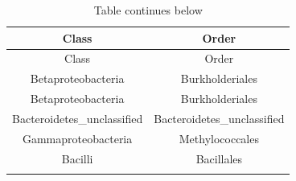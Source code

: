 \documentclass[]{article}
\begin{document}
\begin{longtable}[]{@{}cc@{}}
\caption{Table continues below}\tabularnewline
\toprule
\begin{minipage}[b]{0.38\columnwidth}\centering
Class\strut
\end{minipage} & \begin{minipage}[b]{0.38\columnwidth}\centering
Order\strut
\end{minipage}\tabularnewline
\midrule
\endfirsthead
\toprule
\begin{minipage}[b]{0.38\columnwidth}\centering
Class\strut
\end{minipage} & \begin{minipage}[b]{0.38\columnwidth}\centering
Order\strut
\end{minipage}\tabularnewline
\midrule
\endhead
\begin{minipage}[t]{0.38\columnwidth}\centering
Betaproteobacteria\strut
\end{minipage} & \begin{minipage}[t]{0.38\columnwidth}\centering
Burkholderiales\strut
\end{minipage}\tabularnewline
\begin{minipage}[t]{0.38\columnwidth}\centering
Betaproteobacteria\strut
\end{minipage} & \begin{minipage}[t]{0.38\columnwidth}\centering
Burkholderiales\strut
\end{minipage}\tabularnewline
\begin{minipage}[t]{0.38\columnwidth}\centering
Bacteroidetes\_unclassified\strut
\end{minipage} & \begin{minipage}[t]{0.38\columnwidth}\centering
Bacteroidetes\_unclassified\strut
\end{minipage}\tabularnewline
\begin{minipage}[t]{0.38\columnwidth}\centering
Gammaproteobacteria\strut
\end{minipage} & \begin{minipage}[t]{0.38\columnwidth}\centering
Methylococcales\strut
\end{minipage}\tabularnewline
\begin{minipage}[t]{0.38\columnwidth}\centering
Bacilli\strut
\end{minipage} & \begin{minipage}[t]{0.38\columnwidth}\centering
Bacillales\strut
\end{minipage}\tabularnewline
\begin{minipage}[t]{0.38\columnwidth}\centering

\end{minipage}
\end{longtable}
\end{document}
